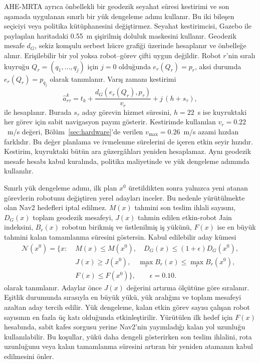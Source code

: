 \documentclass[10pt,letterpaper,onecolumn]{IEEEtran}
\begin{document}
AHE-MRTA ayrıca önbellekli bir geodezik seyahat süresi kestirimi ve son aşamada
uygulanan sınırlı bir yük dengeleme adımı kullanır. Bu iki bileşen seçiciyi veya
politika kütüphanesini değiştirmez. Seyahat kestirimcisi, Gazebo ile paylaşılan
haritadaki 0.55~m şişirilmiş doluluk maskesini kullanır. Geodezik mesafe $d_G$,
sekiz komşulu serbest hücre grafiği üzerinde hesaplanır ve önbelleğe alınır.
Erişilebilir bir yol yoksa robot--görev çifti uygun değildir. Robot $r$'nin
sıralı kuyruğu $Q_r=(q_1,\ldots,q_j)$ için $j=0$ olduğunda $e_r(Q_r)=p_r$,
aksi durumda $e_r(Q_r)=p_{q_j}$ olarak tanımlanır. Varış zamanı kestirimi
\begin{equation}
\hat a_{r\tau}^k=t_k+
\frac{d_G(e_r(Q_r),p_\tau)}{v_r}+j\,(h+s_\tau),
\label{eq:eta}
\end{equation}
ile hesaplanır. Burada $s_\tau$ aday görevin hizmet süresini, $h=22$~s ise
kuyruktaki her görev için sabit navigasyon payını gösterir. Kestirimde kullanılan
$v_r=0.22$~m/s değeri, Bölüm~\ref{sec:hardware}'de verilen
$v_{\max}=0.26$~m/s azami hızdan farklıdır. Bu değer planlama ve ivmelenme
sürelerini de içeren etkin seyir hızıdır. Kestirim, kuyruktaki bütün ara
güzergâhları yeniden hesaplamaz. Aynı geodezik mesafe hesabı kabul kuralında,
politika maliyetinde ve yük dengeleme adımında kullanılır.

Sınırlı yük dengeleme adımı, ilk plan $x^0$ üretildikten sonra yalnızca yeni
atanan görevlerin robotunu değiştiren yerel adayları inceler. Bu nedenle
yürütülmekte olan Nav2 hedefleri iptal edilmez. $M(x)$ tahmini son teslim
ihlali sayısını, $D_G(x)$ toplam geodezik mesafeyi, $J(x)$ tahmin edilen etkin-robot Jain
indeksini, $B_r(x)$ robotun birikmiş ve üstlenilmiş iş yükünü, $F(x)$ ise
en büyük tahmini kalan tamamlanma süresini göstersin. Kabul edilebilir aday
kümesi
\begin{equation}
\begin{aligned}
\mathcal N(x^0)=\big\{x:\;&M(x)\leq M(x^0),\quad
D_G(x)\leq(1+\epsilon)D_G(x^0),\\
&J(x)\geq J(x^0),\quad
\max_rB_r(x)\leq\max_rB_r(x^0),\\
&F(x)\leq F(x^0)\big\},\qquad \epsilon=0.10 .
\end{aligned}
\label{eq:repair}
\end{equation}
olarak tanımlanır. Adaylar önce $J(x)$ değerini artırma ölçütüne göre
sıralanır. Eşitlik durumunda sırasıyla en büyük yükü, yük aralığını ve toplam
mesafeyi azaltan aday tercih edilir. Yük dengeleme, kalan etkin görev sayısı
çalışan robot sayısının en fazla üç katı olduğunda etkinleştirilir. Yürütülen
ilk hedef için $F(x)$ hesabında, sabit kafes sorgusu yerine Nav2'nin yayımladığı
kalan yol uzunluğu kullanılabilir. Bu koşullar, yükü daha dengeli gösterirken
son teslim ihlalini, rota uzunluğunu veya kalan tamamlanma süresini artıran bir
yeniden atamanın kabul edilmesini önler.
\end{document}

